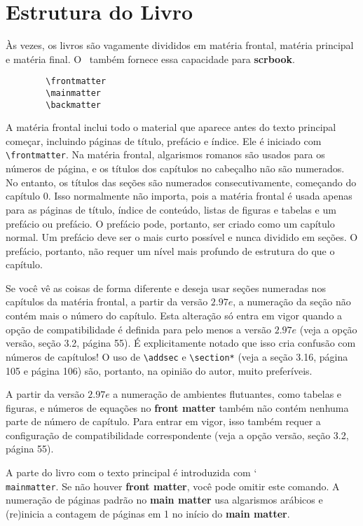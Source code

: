 \chapter{Estrutura do Livro}
Às vezes, os livros são vagamente divididos em matéria frontal, matéria principal e matéria final. O \KOMAScript\ também fornece essa capacidade para \textbf{scrbook}.
\begin{verbatim}
        \frontmatter
        \mainmatter
        \backmatter
\end{verbatim}

A matéria frontal inclui todo o material que aparece antes do texto principal começar, incluindo páginas de título, prefácio e índice. Ele é iniciado com \verb|\frontmatter|. Na matéria frontal, algarismos romanos são usados para os números de página, e os títulos dos capítulos no cabeçalho não são numerados. No entanto, os títulos das seções são numerados consecutivamente, começando do capítulo 0. Isso normalmente não importa, pois a matéria frontal é usada apenas para as páginas de título, índice de conteúdo, listas de figuras e tabelas e um prefácio ou prefácio. O prefácio pode, portanto, ser criado como um capítulo normal. Um prefácio deve ser o mais curto possível e nunca dividido em seções. O prefácio, portanto, não requer um nível mais profundo de estrutura do que o capítulo.

Se você vê as coisas de forma diferente e deseja usar seções numeradas nos capítulos da matéria frontal, a partir da versão $2.97e$, a numeração da seção não contém mais o número do capítulo. Esta alteração só entra em vigor quando a opção de compatibilidade é definida para pelo menos a versão $2.97e$ (veja a opção versão, seção 3.2, página 55). É explicitamente notado que isso cria confusão com números de capítulos! O uso de \verb|\addsec| e \verb|\section*| (veja a seção 3.16, página 105 e página 106) são, portanto, na opinião do autor, muito preferíveis.

A partir da versão $2.97e$ a numeração de ambientes flutuantes, como tabelas e figuras, e números de equações no \textbf{front matter} também não contém nenhuma parte de número de capítulo. Para entrar em vigor, isso também requer a configuração de compatibilidade correspondente (veja a opção versão, seção 3.2, página 55).

A parte do livro com o texto principal é introduzida com \char`\\\texttt{main\-matter}. Se não houver \textbf{front matter}, você pode omitir este comando. A numeração de páginas padrão no \textbf{main matter} usa algarismos arábicos e (re)inicia a contagem de páginas em 1 no início do \textbf{main matter}.

